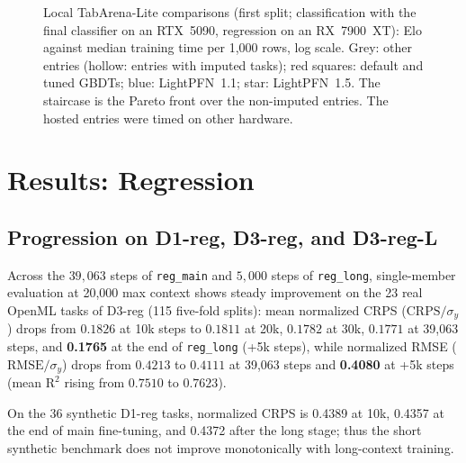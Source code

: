 \documentclass[11pt]{article}
\begin{document}
\begin{figure}[tbp]
\centering
\resizebox{\linewidth}{!}{}
\caption{Local TabArena-Lite comparisons (first split; classification with the final classifier on an RTX~5090, regression on an RX~7900~XT): Elo against median training time per 1,000 rows, log scale. Grey: other entries (hollow: entries with imputed tasks); red squares: default and tuned GBDTs; blue: LightPFN~1.1; star: LightPFN~1.5. The staircase is the Pareto front over the non-imputed entries. The hosted entries were timed on other hardware.}
\label{fig:pareto}
\end{figure}

\section{Results: Regression}
\label{sec:reg-results}

\subsection{Progression on D1-reg, D3-reg, and D3-reg-L}
\label{sec:reg-progression}

Across the $39{,}063$ steps of \texttt{reg\_main} and $5{,}000$ steps of \texttt{reg\_long}, single-member evaluation at 20,000 max context shows steady improvement on the 23 real OpenML tasks of D3-reg (115 five-fold splits): %
mean normalized CRPS ($\mathrm{CRPS}/\sigma_y$) drops from $0.1826$ at 10k steps to $0.1811$ at 20k, $0.1782$ at 30k, $0.1771$ at 39,063 steps, and \textbf{0.1765} at the end of \texttt{reg\_long} (+5k steps), while normalized RMSE ($\mathrm{RMSE}/\sigma_y$) drops from $0.4213$ to $0.4111$ at 39,063 steps and \textbf{0.4080} at +5k steps (mean $\mathrm{R}^2$ rising from $0.7510$ to $0.7623$). %

On the 36 synthetic D1-reg tasks, normalized CRPS is 0.4389 at 10k, 0.4357 at the end of main fine-tuning, and 0.4372 after the long stage; thus the short synthetic benchmark does not improve monotonically with long-context training. %
\end{document}
